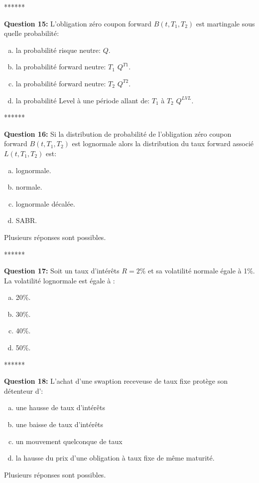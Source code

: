 \documentclass{article}
\newcommand{\indentitem}{\setlength\itemindent{25pt}}
\begin{document}
\smallskip
\centerline{******}
\smallskip
\textbf{Question 15:}
L’obligation zéro coupon forward $B(t,T_1, T_2)$ est martingale sous quelle probabilité:
\begin{enumerate}[a)]
\indentitem \item la probabilité risque neutre: $Q$.
\indentitem \item la probabilité forward neutre: $T_1$ $Q^{T1}$.
\indentitem \item la probabilité forward neutre: $T_2$ $Q^{T2}$.
\indentitem \item la probabilité Level à une période allant de: $T_1$ à $T_2$ $Q^{LVL}$.
\end{enumerate}
\smallskip
\centerline{******}
\smallskip
\newpage
\textbf{Question 16:}
Si la distribution de probabilité de l’obligation zéro coupon forward $B(t,T_1,T_2)$ est lognormale alors la distribution du taux forward associé $L(t,T_1,T_2)$ est:
\begin{enumerate}[a)]
\indentitem \item lognormale.
\indentitem \item normale.
\indentitem \item lognormale décalée.
\indentitem \item SABR.
\end{enumerate}
Plusieurs réponses sont possibles.\\
\smallskip
\centerline{******}
\smallskip
\textbf{Question 17:}
Soit un taux d’intérêts $R=2\%$ et sa volatilité normale égale à 1\%. La volatilité lognormale est égale à :
\begin{enumerate}[a)]
\indentitem \item 20\%.
\indentitem \item 30\%.
\indentitem \item 40\%.
\indentitem \item 50\%.
\end{enumerate}
\smallskip
\centerline{******}
\smallskip
\textbf{Question 18:}
L’achat d’une swaption receveuse de taux fixe protège son détenteur d':
\begin{enumerate}[a)]
\indentitem \item une hausse de taux d’intérêts
\indentitem \item une baisse de taux d’intérêts
\indentitem \item un mouvement quelconque de taux
\indentitem \item la hausse du prix d’une obligation à taux fixe de même maturité.
\end{enumerate}
Plusieurs réponses sont possibles.
\end{document}
